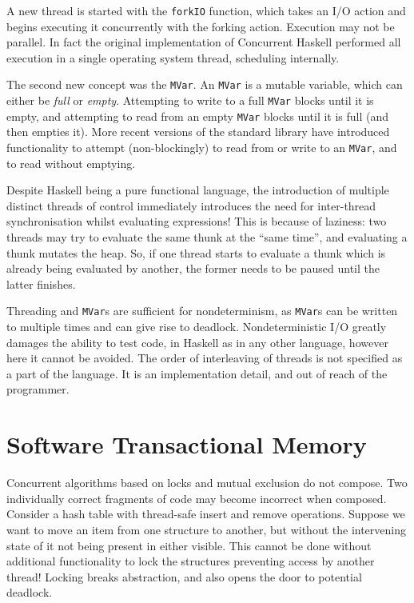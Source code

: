 A new thread is started with the \verb|forkIO| function, which takes
an I/O action and begins executing it concurrently with the forking
action. Execution may not be parallel. In fact the original
implementation of Concurrent Haskell performed all execution in a
single operating system thread, scheduling internally.

The second new concept was the \verb|MVar|. An \verb|MVar| is a
mutable variable, which can either be \textit{full} or
\textit{empty}. Attempting to write to a full \verb|MVar| blocks until
it is empty, and attempting to read from an empty \verb|MVar| blocks
until it is full (and then empties it). More recent versions of the
standard library have introduced functionality to attempt
(non-blockingly) to read from or write to an \verb|MVar|, and to read
without emptying.

Despite Haskell being a pure functional language, the introduction of
multiple distinct threads of control immediately introduces the need
for inter-thread synchronisation whilst evaluating
expressions\cite{concurrent}! This is because of laziness: two threads
may try to evaluate the same thunk at the ``same time'', and
evaluating a thunk mutates the heap. So, if one thread starts to
evaluate a thunk which is already being evaluated by another, the
former needs to be paused until the latter finishes.

Threading and \verb|MVar|s are sufficient for nondeterminism, as
\verb|MVar|s can be written to multiple times and can give rise to
deadlock. Nondeterministic I/O greatly damages the ability to test
code, in Haskell as in any other language, however here it cannot be
avoided. The order of interleaving of threads is not specified as a
part of the language. It is an implementation detail, and out of reach
of the programmer.

\section{Software Transactional Memory}
\label{sec:litrev-stm}

Concurrent algorithms based on locks and mutual exclusion do not
compose. Two individually correct fragments of code may become
incorrect when composed. Consider a hash table with thread-safe insert
and remove operations. Suppose we want to move an item from one
structure to another, but without the intervening state of it not
being present in either visible. This cannot be done without
additional functionality to lock the structures preventing access by
another thread! Locking breaks abstraction, and also opens the door to
potential deadlock.

